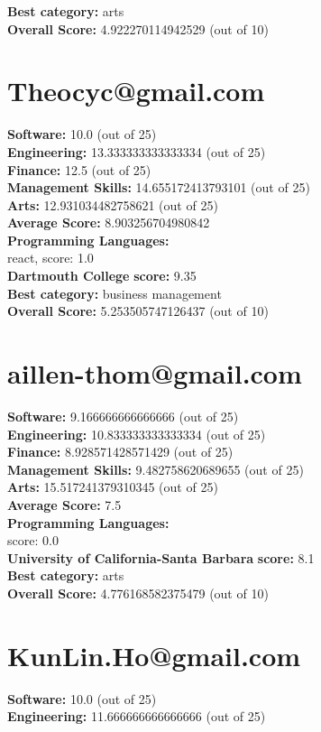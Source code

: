 \documentclass{article}
\begin{document}
\textbf{Best category: } arts\\
\textbf{Overall Score: }4.922270114942529 (out of 10)\section{Theocyc@gmail.com}
\textbf{Software:} 10.0 (out of 25)\\
\textbf{Engineering: } 13.333333333333334 (out of 25)\\
\textbf{Finance:} 12.5 (out of 25)\\
\textbf{Management Skills:} 14.655172413793101 (out of 25)\\
\textbf{Arts:} 12.931034482758621 (out of 25)\\
\textbf{Average Score: } 8.903256704980842\\
\textbf{Programming Languages:} \\
react, score: 1.0\\
\textbf{Dartmouth College} \textbf{score:} 9.35\\
\textbf{Best category: } business management\\
\textbf{Overall Score: }5.253505747126437 (out of 10)\section{aillen-thom@gmail.com}
\textbf{Software:} 9.166666666666666 (out of 25)\\
\textbf{Engineering: } 10.833333333333334 (out of 25)\\
\textbf{Finance:} 8.928571428571429 (out of 25)\\
\textbf{Management Skills:} 9.482758620689655 (out of 25)\\
\textbf{Arts:} 15.517241379310345 (out of 25)\\
\textbf{Average Score: } 7.5\\
\textbf{Programming Languages:} \\
score: 0.0\\
\textbf{University of California-Santa Barbara} \textbf{score:} 8.1\\
\textbf{Best category: } arts\\
\textbf{Overall Score: }4.776168582375479 (out of 10)\section{KunLin.Ho@gmail.com}
\textbf{Software:} 10.0 (out of 25)\\
\textbf{Engineering: } 11.666666666666666 (out of 25)\\
\end{document}
